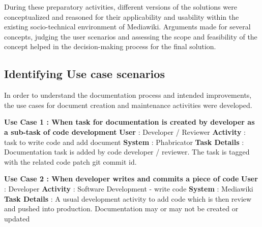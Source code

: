 During these preparatory activities, different versions of the solutions were conceptualized and reasoned for their applicability and usability within the existing socio-technical environment of Mediawiki.
Arguments made for several concepts, judging the user scenarios and assessing the scope and feasibility of the concept helped in the decision-making process for the final solution.


\subsection{Identifying Use case scenarios }
In order to understand the documentation process and intended improvements, the use cases for document creation and maintenance activities were developed.
\newline \newline
\begin{mdframed}[leftmargin=10pt,rightmargin=10pt]
\textbf{Use Case 1 : When task for documentation is created by developer as a sub-task of code development}
\newline\newline \indent \textbf{User} : Developer / Reviewer
\newline \newline \indent \textbf{Activity} : task to write code and add document
\newline \newline \indent \textbf{System} : Phabricator
\newline \newline \indent \textbf{Task Details} : Documentation task is added by code developer / reviewer. The task is tagged with the related code patch git commit id.
\end{mdframed}

\begin{mdframed}[leftmargin=10pt,rightmargin=10pt]
\textbf{Use Case 2 : When developer writes and commits a piece of code}
\newline \newline \indent \textbf{User} : Developer
\newline \newline \indent \textbf{Activity} : Software Development - write code
\newline \newline \indent \textbf{System} : Mediawiki
\newline \newline \indent \textbf{Task Details} : A usual development activity to add code which is then review and pushed into production. Documentation may or may not be created or updated
\end{mdframed}

